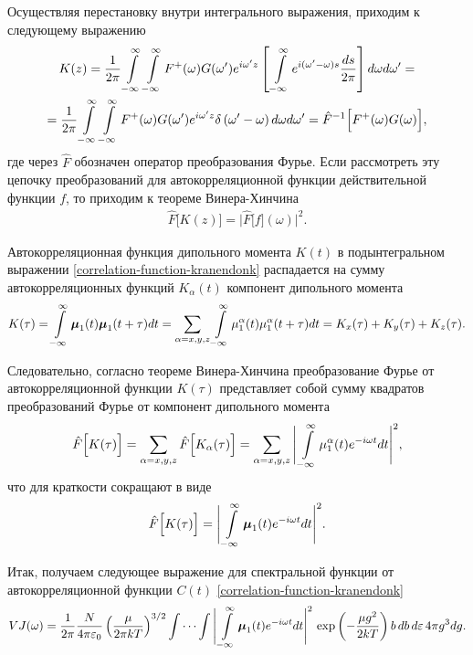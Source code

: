 Осуществляя перестановку внутри интегрального выражения, приходим к следующему выражению 
\begin{gather}
    K(z) = \frac{1}{2\pi} \int\limits_{-\infty}^\infty \int\limits_{-\infty}^\infty F^+(\omega) G(\omega^\prime) e^{i \omega^\prime z} \left[ \, \int\limits_{-\infty}^\infty e^{i (\omega^\prime - \omega) s} \frac{ds}{2 \pi} \right] d\omega d\omega^\prime = \notag \\
    = \frac{1}{2\pi} \int\limits_{-\infty}^\infty \int\limits_{-\infty}^\infty F^+(\omega) G(\omega^\prime) e^{i \omega^\prime z} \delta \left( \omega^\prime - \omega \right) d\omega d\omega^\prime = \hat{F}^{-1} \Big[ F^+(\omega) G(\omega) \Big],
\end{gather}
%
где через $\hat{F}$ обозначен оператор преобразования Фурье. Если рассмотреть эту цепочку преобразований для автокорреляционной функции действительной функции $f$, то приходим к теореме Винера-Хинчина \cite{frommhold}
\begin{gather}
    \hat{F} \Big[ K(z) \Big] = \Bigg\vert \hat{F}\Big[ f \Big](\omega) \Bigg\vert^2. 
\end{gather}

Автокорреляционная функция дипольного момента $K(t)$ в подынтегральном выражении \eqref{correlation-function-kranendonk} распадается на сумму автокорреляционных функций $K_\alpha(t)$ компонент дипольного момента 
\begin{gather}
    K(\tau) = \int\limits_{-\infty}^\infty \boldsymbol{\mu}_1(t) \boldsymbol{\mu}_1(t + \tau) dt = \sum_{\alpha = x, y, z} \int\limits_{-\infty}^\infty \mu_1^\alpha(t) \mu_1^\alpha(t + \tau) dt = K_x(\tau) + K_y(\tau) + K_z(\tau).
\end{gather}

Следовательно, согласно теореме Винера-Хинчина преобразование Фурье от автокорреляционной функции $K(\tau)$ представляет собой сумму квадратов преобразований Фурье от компонент дипольного момента 
\begin{gather}
    \hat{F}\Big[ K(\tau) \Big] = \sum_{\alpha = x,y,z} \hat{F} \Big[ K_\alpha(\tau) \Big] = \sum_{\alpha=x,y,z} \Bigg\vert \int\limits_{-\infty}^\infty \mu_1^\alpha(t) e^{-i\omega t} dt \Bigg\vert^2,
\end{gather}
% 
что для краткости сокращают в виде 
\begin{gather}
    \hat{F} \Big[ K(\tau) \Big] = \Bigg\vert \int\limits_{-\infty}^\infty \boldsymbol{\mu}_1(t) e^{-i\omega t} dt \Bigg\vert^2. \label{correlation-theorem}
\end{gather}

Итак, получаем следующее выражение для спектральной функции от автокорреляционной функции $C(t)$ \eqref{correlation-function-kranendonk}  
\begin{gather}
    VJ(\omega) = \frac{1}{2 \pi} \frac{N}{4\pi \varepsilon_0} \left( \frac{\mu}{2 \pi k T} \right)^{3/2} \idotsint \Bigg\vert \int\limits_{-\infty}^\infty \boldsymbol{\mu}_1(t) e^{-i \omega t} dt \Bigg\vert^2 \, \exp \left( -\frac{\mu g^2}{2 k T} \right) b \, db \, d \varepsilon \, 4 \pi g^3 dg. \label{spectral-function-kranendonk}
\end{gather}

